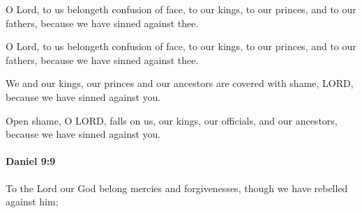 			O Lord, to us belongeth confusion of face, to our kings, to our princes, and to our fathers, because we have sinned against thee.

			\begin{versebox}
					\item[BHS] 
					\item[LXX] 
					\item[ASV] O Lord, to us belongeth confusion of face, to our kings, to our princes, and to our fathers, because we have sinned against thee.
					\item[NIV] We and our kings, our princes and our ancestors are covered with shame, LORD, because we have sinned against you.
					\item[NRSV] Open shame, O LORD, falls on us, our kings, our officials, and our ancestors, because we have sinned against you.
			\end{versebox}

		\paragraph{Daniel 9:9} %
			\label{DANIEL-9-9}

			To the Lord our God belong mercies and forgivenesses, though we have rebelled against him;

